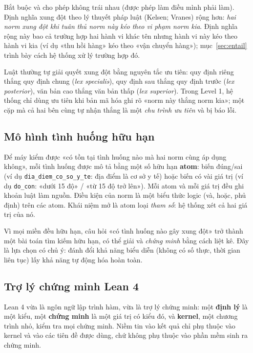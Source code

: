 \documentclass[12pt,a4paper]{article}
\newcommand{\code}[1]{\texttt{#1}}
\newcommand{\term}[1]{\textbf{#1}}
\begin{document}
Bắt buộc và cho phép không trái nhau (được phép làm điều mình phải làm). Định nghĩa xung đột theo lý thuyết pháp luật
(Kelsen; Vranes) rộng hơn: \emph{hai norm xung đột khi tuân thủ norm này kéo theo vi phạm norm kia}. Định nghĩa rộng này bao
cả trường hợp hai hành vi khác tên nhưng hành vi này kéo theo hành vi kia (ví dụ «thu hồi hàng» kéo theo «vận chuyển hàng»);
mục~\ref{sec:entail} trình bày cách hệ thống xử lý trường hợp đó.

Luật thường tự giải quyết xung đột bằng nguyên tắc ưu tiên: quy định riêng thắng quy định chung (\emph{lex specialis}), quy
định sau thắng quy định trước (\emph{lex posterior}), văn bản cao thắng văn bản thấp (\emph{lex superior}). Trong Level 1, hệ
thống chỉ dùng ưu tiên khi bản mã hóa ghi rõ «norm này thắng norm kia»; một cặp mà cả hai bên cùng tự nhận thắng là một
\emph{chu trình ưu tiên} và bị báo lỗi.

\subsection{Mô hình tình huống hữu hạn}

Để máy kiểm được «có tồn tại tình huống nào mà hai norm cùng áp dụng không», mỗi tình huống được mô tả bằng một số hữu hạn
\term{atom}: biến đúng/sai (ví dụ \code{dia\_diem\_co\_so\_y\_te}: địa điểm là cơ sở y tế) hoặc biến có vài giá trị
(ví dụ \code{do\_con}: «dưới 15 độ» / «từ 15 độ trở lên»). Mỗi atom và mỗi giá trị đều ghi khoản luật làm nguồn. Điều kiện
của norm là một biểu thức logic (và, hoặc, phủ định) trên các atom. Khái niệm mở là atom loại \emph{tham số}: hệ thống xét cả
hai giá trị của nó.

Vì mọi miền đều hữu hạn, câu hỏi «có tình huống nào gây xung đột» trở thành một bài toán tìm kiếm hữu hạn, có thể giải và
\emph{chứng minh} bằng cách liệt kê. Đây là lựa chọn có chủ ý: đánh đổi khả năng biểu diễn (không có số thực, thời gian liên
tục) lấy khả năng tự động hóa hoàn toàn.

\subsection{Trợ lý chứng minh Lean 4}

Lean 4 vừa là ngôn ngữ lập trình hàm, vừa là trợ lý chứng minh: một \term{định lý} là một kiểu, một \term{chứng minh} là một
giá trị có kiểu đó, và \term{kernel}, một chương trình nhỏ, kiểm tra mọi chứng minh. Niềm tin vào kết quả chỉ phụ thuộc vào
kernel và vào các tiên đề được dùng, chứ không phụ thuộc vào phần mềm sinh ra chứng minh.
\end{document}
